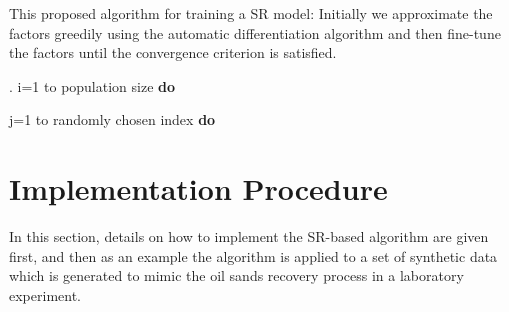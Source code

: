 \documentclass[final,5p,times,twocolumn]{elsarticle}
\newlength\myindent
\newcommand\bindent{%
	\begingroup
	\setlength{\itemindent}{\myindent}
	\addtolength{\algorithmicindent}{\myindent}
}
\newcommand\eindent{\endgroup}
\begin{document}
\begin{algorithm}[!htbp]
	\caption{This proposed algorithm for training a SR model: Initially we approximate the factors greedily using the automatic differentiation algorithm \cite{neidinger2010introduction} and then fine-tune the factors until the convergence criterion is satisfied.}
	\label{algo:deepnmfalgo}
	\begin{algorithmic}
		
		\STATE {}
		\bindent
		. 
		\STATE {}
		\STATE {}
		\STATE {}
		\eindent
		\STATE {}
		 {i=1} to population size {\bfseries do} 
		
		
		\bindent
		
		\bindent
		 {j=1} to randomly chosen index {\bfseries do}
		\eindent
		\STATE {}
		\bindent
		\STATE {}
		\eindent
		\STATE {}
		
		\bindent
		\eindent
		\bindent
		\ENDIF
		\eindent
        \eindent
		
		\ENDWHILE
		
		
	\end{algorithmic}
\end{algorithm}


\section{Implementation Procedure}\label{sec:experiments}
In this section, details on how to implement the SR-based algorithm are given first, and then as an example the algorithm is applied to a set of synthetic data which is generated to mimic the oil sands recovery process in a laboratory experiment. 
\end{document}
